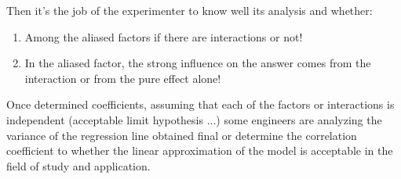 	Then it's the job of the experimenter to know well its analysis and whether:
	\begin{enumerate}
		\item Among the aliased factors if there are interactions or not!

		\item In the aliased factor, the strong influence on the answer comes from the interaction or from the pure effect alone!
	\end{enumerate}
	Once determined coefficients, assuming that each of the factors or interactions is independent (acceptable limit hypothesis ...) some engineers are analyzing the variance of the regression line obtained final or determine the correlation coefficient to whether the linear approximation of the model is acceptable in the field of study and application.
	
